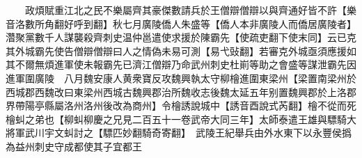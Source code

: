 　　政煩賦重江北之民不樂屬齊其豪傑數請兵於王僧辯僧辯以與齊通好皆不許【樂音洛數所角翻好呼到翻】秋七月廣陵僑人朱盛等【僑人本非廣陵人而僑居廣陵者】濳聚黨數千人謀襲殺齊刺史温仲邕遣使求援於陳霸先【使疏吏翻下使末同】云已克其外城霸先使告僧辯僧辯曰人之情偽未易可測【易弋䜴翻】若審克外城亟須應援如其不爾無煩進軍使未報霸先已濟江僧辯乃命武州刺史杜崱等助之會盛等謀泄霸先因進軍圍廣陵　八月魏安康人黄衆寶反攻魏興執太守柳檜進圍東梁州【梁置南梁州於西城郡西魏改曰東梁州西城古魏興郡治所魏收志後魏太延五年别置魏興郡於上洛郡界帶陽亭縣屬洛州洛州後改為商州】令檜誘說城中【誘音酉說式芮翻】檜不從而死檜虯之弟也【柳虯柳慶之兄見二百五十一卷武帝大同三年】太師泰遣王雄與驃騎大將軍武川宇文虯討之【驃匹妙翻騎奇寄翻】　武陵王紀舉兵由外水東下以永豐侯撝為益州刺史守成都使其子宜都王